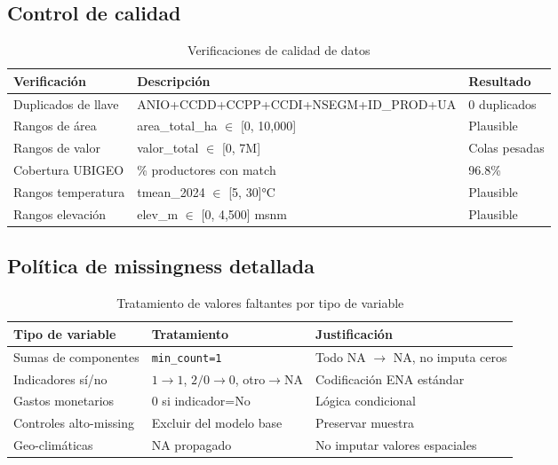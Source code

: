 \documentclass[11pt,a4paper]{article}
\begin{document}
\subsection{Control de calidad}

\begin{table}[H]
\centering
\caption{Verificaciones de calidad de datos}
\label{tab:qa_checks}
\begin{threeparttable}
\small
\begin{tabular}{p{4cm}p{6cm}p{3cm}}
\toprule
\textbf{Verificación} & \textbf{Descripción} & \textbf{Resultado} \\
\midrule
Duplicados de llave & ANIO+CCDD+CCPP+CCDI+NSEGM+ID\_PROD+UA & 0 duplicados \\
Rangos de área & area\_total\_ha $\in$ [0, 10{,}000] & Plausible \\
Rangos de valor & valor\_total $\in$ [0, 7M] & Colas pesadas \\
Cobertura UBIGEO & \% productores con match & 96.8\% \\
Rangos temperatura & tmean\_2024 $\in$ [5, 30]°C & Plausible \\
Rangos elevación & elev\_m $\in$ [0, 4{,}500] msnm & Plausible \\
\bottomrule
\end{tabular}
\end{threeparttable}
\end{table}

\subsection{Política de missingness detallada}

\begin{table}[H]
\centering
\caption{Tratamiento de valores faltantes por tipo de variable}
\label{tab:missingness_policy}
\begin{threeparttable}
\small
\begin{tabular}{p{3.5cm}p{4cm}p{5.5cm}}
\toprule
\textbf{Tipo de variable} & \textbf{Tratamiento} & \textbf{Justificación} \\
\midrule
Sumas de componentes & \texttt{min\_count=1} & Todo NA $\to$ NA, no imputa ceros \\
Indicadores sí/no & $1\to 1$, $2/0\to 0$, otro$\to$NA & Codificación ENA estándar \\
Gastos monetarios & 0 si indicador=No & Lógica condicional \\
Controles alto-missing & Excluir del modelo base & Preservar muestra \\
Geo-climáticas & NA propagado & No imputar valores espaciales \\
\bottomrule
\end{tabular}
\end{threeparttable}
\end{table}
\end{document}
